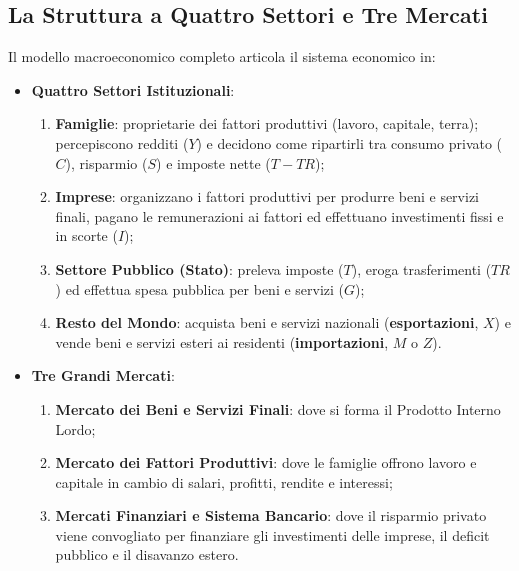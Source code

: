 \subsection{La Struttura a Quattro Settori e Tre Mercati}
Il modello macroeconomico completo articola il sistema economico in:
\begin{itemize}
    \item \textbf{Quattro Settori Istituzionali}:
    \begin{enumerate}
        \item \textbf{Famiglie}: proprietarie dei fattori produttivi (lavoro, capitale, terra); percepiscono redditi ($Y$) e decidono come ripartirli tra consumo privato ($C$), risparmio ($S$) e imposte nette ($T - TR$);
        \item \textbf{Imprese}: organizzano i fattori produttivi per produrre beni e servizi finali, pagano le remunerazioni ai fattori ed effettuano investimenti fissi e in scorte ($I$);
        \item \textbf{Settore Pubblico (Stato)}: preleva imposte ($T$), eroga trasferimenti ($TR$) ed effettua spesa pubblica per beni e servizi ($G$);
        \item \textbf{Resto del Mondo}: acquista beni e servizi nazionali (\textbf{esportazioni}, $X$) e vende beni e servizi esteri ai residenti (\textbf{importazioni}, $M$ o $Z$).
    \end{enumerate}
    
    \item \textbf{Tre Grandi Mercati}:
    \begin{enumerate}
        \item \textbf{Mercato dei Beni e Servizi Finali}: dove si forma il Prodotto Interno Lordo;
        \item \textbf{Mercato dei Fattori Produttivi}: dove le famiglie offrono lavoro e capitale in cambio di salari, profitti, rendite e interessi;
        \item \textbf{Mercati Finanziari e Sistema Bancario}: dove il risparmio privato viene convogliato per finanziare gli investimenti delle imprese, il deficit pubblico e il disavanzo estero.
    \end{enumerate}
\end{itemize}

